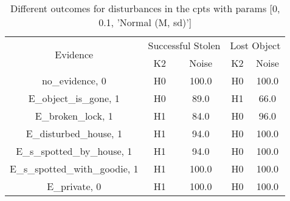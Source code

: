 \begin{table}\begin{tabular}{c|cc|cc}\toprule\multirow{2}{*}{Evidence} & \multicolumn{2}{c}{Successful Stolen} & \multicolumn{2}{c}{Lost Object} \\& {K2} & {Noise} & {K2} & {Noise} \\\midrule
no\_evidence, 0 & H0&100.0&H0&100.0\\E\_object\_is\_gone, 1 & \cellcolor{Bittersweet}H0&\cellcolor{Bittersweet}89.0&\cellcolor{Bittersweet}H1&\cellcolor{Bittersweet}66.0\\E\_broken\_lock, 1 & \cellcolor{Bittersweet}H1&\cellcolor{Bittersweet}84.0&H0&96.0\\E\_disturbed\_house, 1 & \cellcolor{Bittersweet}H1&\cellcolor{Bittersweet}94.0&H0&100.0\\E\_s\_spotted\_by\_house, 1 & \cellcolor{Bittersweet}H1&\cellcolor{Bittersweet}94.0&H0&100.0\\E\_s\_spotted\_with\_goodie, 1 & H1&100.0&H0&100.0\\E\_private, 0 & H1&100.0&H0&100.0\\\bottomrule\end{tabular}\caption{Different outcomes for disturbances in the cpts with params [0, 0.1, 'Normal (M, sd)']}\end{table}